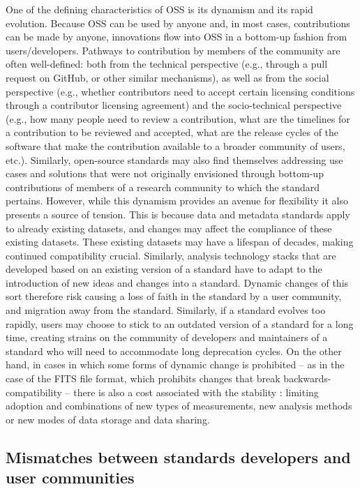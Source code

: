 \documentclass[
  number]{elsarticle}
\begin{document}
One of the defining characteristics of OSS is its dynamism and its rapid
evolution. Because OSS can be used by anyone and, in most cases,
contributions can be made by anyone, innovations flow into OSS in a
bottom-up fashion from users/developers. Pathways to contribution by
members of the community are often well-defined: both from the technical
perspective (e.g., through a pull request on GitHub, or other similar
mechanisms), as well as from the social perspective (e.g., whether
contributors need to accept certain licensing conditions through a
contributor licensing agreement) and the socio-technical perspective
(e.g., how many people need to review a contribution, what are the
timelines for a contribution to be reviewed and accepted, what are the
release cycles of the software that make the contribution available to a
broader community of users, etc.). Similarly, open-source standards may
also find themselves addressing use cases and solutions that were not
originally envisioned through bottom-up contributions of members of a
research community to which the standard pertains. However, while this
dynamism provides an avenue for flexibility it also presents a source of
tension. This is because data and metadata standards apply to already
existing datasets, and changes may affect the compliance of these
existing datasets. These existing datasets may have a lifespan of
decades, making continued compatibility crucial. Similarly, analysis
technology stacks that are developed based on an existing version of a
standard have to adapt to the introduction of new ideas and changes into
a standard. Dynamic changes of this sort therefore risk causing a loss
of faith in the standard by a user community, and migration away from
the standard. Similarly, if a standard evolves too rapidly, users may
choose to stick to an outdated version of a standard for a long time,
creating strains on the community of developers and maintainers of a
standard who will need to accommodate long deprecation cycles. On the
other hand, in cases in which some forms of dynamic change is prohibited
-- as in the case of the FITS file format, which prohibits changes that
break backwards-compatibility -- there is also a cost associated with
the stability \citep{Scroggins2020-ut}: limiting adoption and
combinations of new types of measurements, new analysis methods or new
modes of data storage and data sharing.

\subsection{Mismatches between standards developers and user
communities}\label{mismatches-between-standards-developers-and-user-communities}
\end{document}
